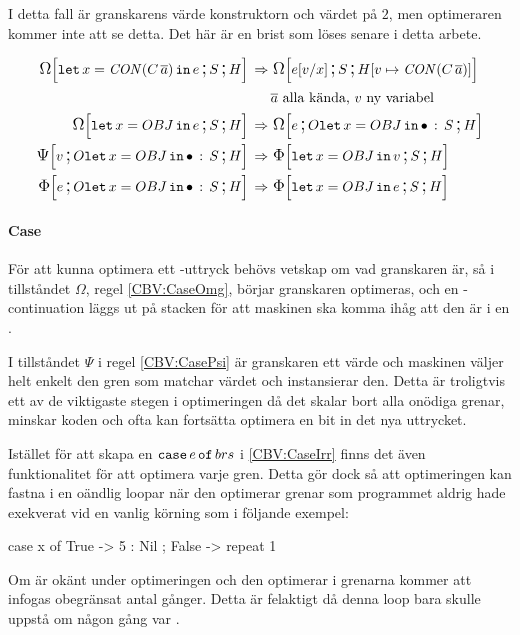 \documentclass[../Optimise]{subfiles}
\begin{document}
I detta fall är granskarens värde konstruktorn  och värdet på  $2$, men optimeraren
kommer inte att se detta. Det här är en brist som löses senare i detta arbete.

\begin{align}
\label{CBV:OLet1} \OMEGA SH{\eLet x{\CON{C}{\many{a}}}{e}}  \rulesep &\, \OMEGA S{\heap{v}{\CON{C}{\many{a}}}}{e[v/x]}\\
 & \many{a} \text{ alla kända, } v \text{ ny variabel} \nonumber \\
\label{CBV:OLet2}\OMEGA SH{\eLet x{OBJ}{e}}  \rulesep &\, \OMEGA{\oLetObj x{OBJ}S}He\\
\label{CBV:OLet3}\PSI{\oLetObj x{OBJ}S}Hv  \rulesep &\, \IRR SH{\eLet x{OBJ}v}\\
\label{CBV:OLet4}\IRR{\oLetObj x{OBJ}S}He  \rulesep &\, \IRR SH{\eLet x{OBJ}e}
\end{align}


\paragraph{Case}
\label{cbv:case}
För att kunna optimera ett -uttryck behövs vetskap om vad granskaren är,
så i tillståndet $\Omega$, regel \eqref{CBV:CaseOmg}, börjar granskaren optimeras, och en
-continuation läggs ut på stacken för att maskinen ska komma ihåg att den är i en .

I tillståndet $\Psi$ i regel \eqref{CBV:CasePsi} är granskaren ett värde och maskinen väljer helt
enkelt den gren som matchar värdet och instansierar den.
Detta är troligtvis ett av de viktigaste stegen i optimeringen då det skalar bort alla onödiga 
grenar, minskar koden och ofta kan fortsätta optimera en bit in det nya uttrycket.

Istället för att skapa en $\eCase e brs$ i \eqref{CBV:CaseIrr} finns det även
funktionalitet för att
optimera varje gren. Detta gör dock så att optimeringen kan fastna
i en oändlig loopar när den optimerar grenar som programmet aldrig hade exekverat
vid en vanlig körning som i följande exempel: 

\begin{codeEx}
case x of
    { True  -> 5 : Nil
    ; False -> repeat 1
    }
\end{codeEx}

Om  är okänt under optimeringen och den optimerar i grenarna kommer 
 att infogas obegränsat antal gånger. Detta är felaktigt då denna loop bara skulle uppstå
om  någon gång var .
\end{document}
